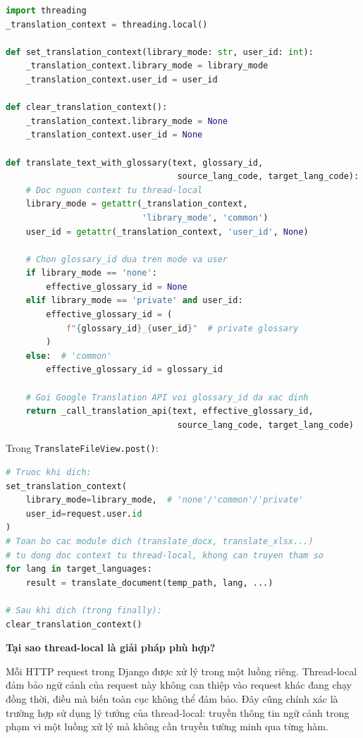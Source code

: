 \begin{lstlisting}[language=Python, caption={Thread-local context trong translate\_text.py}]
import threading
_translation_context = threading.local()

def set_translation_context(library_mode: str, user_id: int):
    _translation_context.library_mode = library_mode
    _translation_context.user_id = user_id

def clear_translation_context():
    _translation_context.library_mode = None
    _translation_context.user_id = None

def translate_text_with_glossary(text, glossary_id,
                                  source_lang_code, target_lang_code):
    # Doc nguon context tu thread-local
    library_mode = getattr(_translation_context,
                           'library_mode', 'common')
    user_id = getattr(_translation_context, 'user_id', None)

    # Chon glossary_id dua tren mode va user
    if library_mode == 'none':
        effective_glossary_id = None
    elif library_mode == 'private' and user_id:
        effective_glossary_id = (
            f"{glossary_id}_{user_id}"  # private glossary
        )
    else:  # 'common'
        effective_glossary_id = glossary_id

    # Goi Google Translation API voi glossary_id da xac dinh
    return _call_translation_api(text, effective_glossary_id,
                                  source_lang_code, target_lang_code)
\end{lstlisting}

Trong \texttt{TranslateFileView.post()}:

\begin{lstlisting}[language=Python, caption={Thiết lập và xóa context (translate.py -- TranslateFileView)}]
# Truoc khi dich:
set_translation_context(
    library_mode=library_mode,  # 'none'/'common'/'private'
    user_id=request.user.id
)
# Toan bo cac module dich (translate_docx, translate_xlsx...)
# tu dong doc context tu thread-local, khong can truyen tham so
for lang in target_languages:
    result = translate_document(temp_path, lang, ...)

# Sau khi dich (trong finally):
clear_translation_context()
\end{lstlisting}

\textbf{Tại sao thread-local là giải pháp phù hợp?}

Mỗi HTTP request trong Django được xử lý trong một luồng riêng. Thread-local đảm bảo ngữ cảnh
của request này không can thiệp vào request khác đang chạy đồng thời, điều mà biến toàn cục
không thể đảm bảo. Đây cũng chính xác là trường hợp sử dụng lý tưởng của thread-local: truyền
thông tin ngữ cảnh trong phạm vi một luồng xử lý mà không cần truyền tường minh qua từng hàm.

